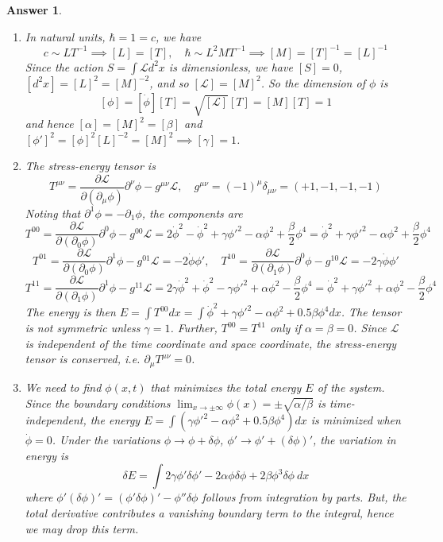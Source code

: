 \documentclass[a4paper]{article}
\newtheorem{ans}{Answer}[section]
\theoremstyle{new}
\begin{document}
\begin{ans}\leavevmode
\begin{enumerate}[label=(\alph*)]
\item In natural units, $\hbar=1=c$, we have
$$c\sim LT^{-1}\implies [L]=[T],\quad\hbar\sim L^2MT^{-1}\implies[M]=[T]^{-1}=[L]^{-1}$$
Since the action $S=\int\mathcal{L}d^2x$ is dimensionless, we have $[S]=0$, $[d^2x]=[L]^{2}=[M]^{-2}$, and so $[\mathcal{L}]=[M]^2$. So the dimension of $\phi$ is
$$[\phi]=[\dot{\phi}][T]=\sqrt{[\mathcal{L}]}[T]=[M][T]=1$$
and hence $ [\alpha]=[M]^2=[\beta]$ and $[\phi']^2=[\phi]^2[L]^{-2}=[M]^2\implies[\gamma]=1$.
\item The stress-energy tensor is
$$T^{\mu\nu}=\frac{\partial\mathcal{L}}{\partial(\partial_\mu\phi)}\partial^\nu\phi-g^{\mu\nu}\mathcal{L},\quad g^{\mu\nu}=(-1)^\mu\delta_{\mu\nu}=(+1,-1,-1,-1)$$
Noting that $\partial^1\phi=-\partial_1\phi$, the components are
$$T^{00}=\frac{\partial\mathcal{L}}{\partial(\partial_0\phi)}\partial^0\phi-g^{00}\mathcal{L}=2\dot{\phi}^2-\dot{\phi}^2+\gamma\phi'^2-\alpha\phi^2+\frac{\beta}{2}\phi^4=\dot{\phi}^2+\gamma\phi'^2-\alpha\phi^2+\frac{\beta}{2}\phi^4$$
$$T^{01}=\frac{\partial\mathcal{L}}{\partial(\partial_0\phi)}\partial^1\phi-g^{01}\mathcal{L}=-2\dot{\phi}\phi',\quad T^{10}=\frac{\partial\mathcal{L}}{\partial(\partial_1\phi)}\partial^0\phi-g^{10}\mathcal{L}=-2\gamma\dot{\phi}\phi'$$
$$T^{11}=\frac{\partial\mathcal{L}}{\partial(\partial_1\phi)}\partial^1\phi-g^{11}\mathcal{L}=2\gamma\dot{\phi}^2+\dot{\phi}^2-\gamma\phi'^2+\alpha\phi^2-\frac{\beta}{2}\phi^4=\dot{\phi}^2+\gamma\phi'^2+\alpha\phi^2-\frac{\beta}{2}\phi^4$$
The energy is then $E=\int T^{00}dx=\int\dot{\phi}^2+\gamma\phi'^2-\alpha\phi^2+0.5\beta\phi^4dx$. The tensor is not symmetric unless $\gamma=1$. Further, $T^{00}=T^{11}$ only if $\alpha=\beta=0$. Since $\mathcal{L}$ is independent of the time coordinate and space coordinate, the stress-energy tensor is conserved, i.e. $\partial_\mu T^{\mu\nu}=0$.
\item We need to find $\phi(x,t)$ that minimizes the total energy $E$ of the system. Since the boundary conditions $\lim_{x\rightarrow\pm\infty}\phi(x)=\pm\sqrt{\alpha/\beta}$ is time-independent, the energy $E=\int(\gamma\phi'^2-\alpha\phi^2+0.5\beta\phi^4)dx$ is minimized when $\dot{\phi}=0$. Under the variations $\phi\rightarrow\phi+\delta\phi$, $\phi'\rightarrow\phi'+(\delta\phi)'$, the variation in energy is
$$\delta E=\int 2\gamma\phi'\delta\phi'-2\alpha\phi\delta\phi+2\beta\phi^3\delta\phi~dx$$
where $\phi'(\delta\phi)'=(\phi'\delta\phi)'-\phi''\delta\phi$ follows from integration by parts. But, the total derivative contributes a vanishing boundary term to the integral, hence we may drop this term.

\end{enumerate}
\end{ans}
\end{document}
